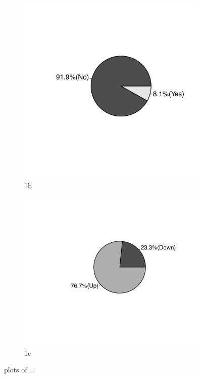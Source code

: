 \documentclass[10pt, conference]{IEEEtran}
\begin{document}
\begin{figure}[!hbt]
\begin{subfigure}{.5\textwidth}
  \includegraphics{figures/ds_distribution_2.pdf}
  \caption{1b}
  \label{fig:sfig2}
\end{subfigure}
\begin{subfigure}{.5\textwidth}
  \centering
  \includegraphics{figures/ds_distribution_3.pdf}
  \caption{1c}
  \label{fig:sfig3}
\end{subfigure}

\caption{plots of....}
\label{fig:fig}
\end{figure}
\end{document}
